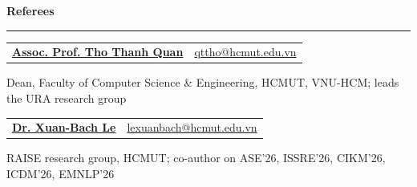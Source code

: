 \documentclass[11pt,a4paper]{article}
\makeatletter
\newcommand{\sectiontitle}[1]{%
  \Needspace{5\baselineskip}
  \vspace{0.28cm}%
  {\Large\bfseries #1}\par\vspace{0.08cm}\hrule\vspace{0.18cm}%
}
\newcommand{\headerline}[2]{%
  \noindent\begin{tabular*}{\textwidth}{@{}l@{\extracolsep{\fill}}r@{}}
  #1 & #2
  \end{tabular*}\par
}
\newcommand{\refentry}[4]{%
  \vspace{0.16cm}
  \headerline{\textbf{\href{#2}{#1}}}{\small\href{mailto:#4}{#4}}
  {\small #3}\par
}
\makeatother
\begin{document}
\sectiontitle{Referees}
\refentry{Assoc. Prof. Tho Thanh Quan}{https://scholar.google.com/citations?user=mvFo93sAAAAJ}{Dean, Faculty of Computer Science \& Engineering, HCMUT, VNU-HCM; leads the URA research group}{qttho@hcmut.edu.vn}

\refentry{Dr. Xuan-Bach Le}{https://lexuanbach.github.io/}{RAISE research group, HCMUT; co-author on ASE'26, ISSRE'26, CIKM'26, ICDM'26, EMNLP'26}{lexuanbach@hcmut.edu.vn}
\end{document}
